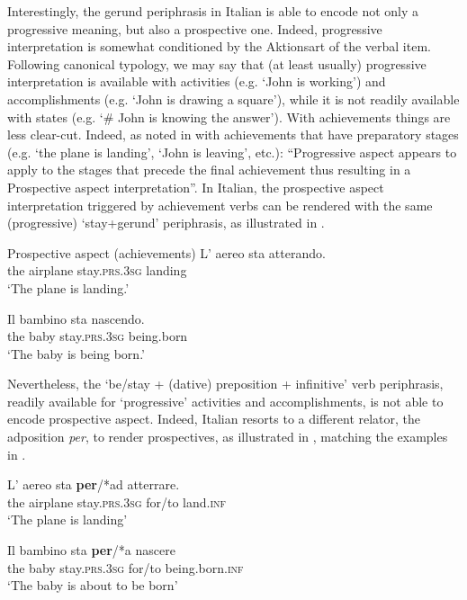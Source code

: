 \documentclass[output=paper,modfonts,nonflat,newtxmath,colorlinks,citecolor=brown]{langsci/langscibook}
\begin{document}
Interestingly, the gerund periphrasis in Italian is able to encode not only a progressive meaning, but also a prospective one. Indeed, progressive interpretation is somewhat conditioned by the Aktionsart of the verbal item. Following  canonical typology, we may say that (at least usually) progressive interpretation is available with {activities} (e.g. ‘John is working’) and {accomplishments} (e.g. ‘John is drawing a square’), while it is not readily available with {states} (e.g. ‘\# John is knowing the answer’). With {achievements} things are less clear-cut. Indeed, as noted in \citet[538]{Cinque2017} with achievements that have preparatory stages (e.g. ‘the plane is landing’, ‘John is leaving’, etc.): “Progressive aspect appears to apply to the stages that precede the final achievement thus resulting in a Prospective aspect interpretation”. In Italian, the prospective aspect interpretation triggered by achievement verbs can be rendered with the same (progressive) ‘stay+gerund’ periphrasis, as illustrated in . 

\ea Prospective aspect (achievements)%
	\label{ex:franco:22}
    \ea \label{ex:franco:22a}
    \gll L’ aereo sta atterando.\\
        	the airplane stay.\textsc{prs.3sg} landing\\
    \glt ‘The plane is landing.’
    
     \ex \label{ex:franco:22b}
    \gll Il bambino sta nascendo.  \\
        the baby stay.\textsc{prs.3sg} being.born\\
    \glt ‘The baby is being born.’
    \z
    \z
    
Nevertheless, the ‘be/stay + (dative) preposition + infinitive’ verb periphrasis, readily available for ‘progressive’ activities and accomplishments, is not able to encode prospective aspect. Indeed, Italian resorts to a different relator, the adposition \textit{per}, to render prospectives, as illustrated in , matching the examples in .

\ea%
	\label{ex:franco:23}
    \ea \label{ex:franco:23a}
    \gll L’ aereo sta \textbf{per}/*ad atterrare.\\
       the airplane stay.\textsc{prs.3sg} for/to land.\textsc{inf}\\
    \glt  ‘The plane is landing’
    
     \ex \label{ex:franco:23b}
    \gll  Il bambino sta \textbf{per}/*a nascere\\
        the baby stay.\textsc{prs.3sg} for/to being.born.\textsc{inf}\\
    \glt ‘The baby is about to be born’
    \z
    \z
\end{document}
